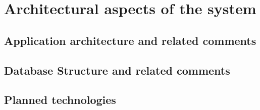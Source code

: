 \chapter{Architectural aspects of the system}\label{ch:architectural-aspects-of-the-system}


\section{Application architecture and related comments}\label{sec:application-architecture-and-related-comments}



\section{Database Structure and related comments}\label{sec:database-structure-and-related-comments}



\section{Planned technologies}\label{sec:planned-technologies}


